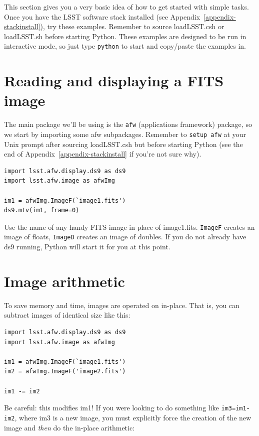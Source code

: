 This section gives you a very basic idea of how to get started with
simple tasks.  Once you have the LSST software stack installed (see
Appendix~\ref{appendix-stackinstall}), try these examples.  Remember
to source loadLSST.csh or loadLSST.sh before starting Python.  These
examples are designed to be run in interactive mode, so just type
\texttt{python} to start and copy/paste the examples in.


\section{Reading and displaying a FITS image}

The main package we'll be using is the \texttt{afw} (applications
framework) package, so we start by importing some afw subpackages.
Remember to \texttt{setup afw} at your Unix prompt after sourcing
loadLSST.csh but before starting Python (see the end of
Appendix~\ref{appendix-stackinstall} if you're not sure why).

\begin{verbatim}
import lsst.afw.display.ds9 as ds9
import lsst.afw.image as afwImg

im1 = afwImg.ImageF(`image1.fits')
ds9.mtv(im1, frame=0)
\end{verbatim}

Use the name of any handy FITS image in place of image1.fits.
\texttt{ImageF} creates an image of floats, \texttt{ImageD} creates an
image of doubles.  If you do not already have ds9 running, Python will
start it for you at this point.

\section{Image arithmetic}

To save memory and time, images are operated on in-place.  That is,
you can subtract images of identical size like this:

\begin{verbatim}
import lsst.afw.display.ds9 as ds9
import lsst.afw.image as afwImg

im1 = afwImg.ImageF(`image1.fits')
im2 = afwImg.ImageF('image2.fits')

im1 -= im2
\end{verbatim}

Be careful: this modifies im1!  If you were looking to do something
like \texttt{im3=im1-im2}, where im3 is a new image, you must
explicitly force the creation of the new image and {\it then} do the
in-place arithmetic:

